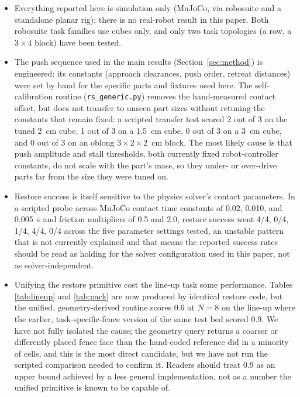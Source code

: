 \documentclass[11pt]{article}
\begin{document}
\begin{itemize}
  \item Everything reported here is simulation only (MuJoCo, via robosuite
  and a standalone planar rig); there is no real-robot result in this
  paper. Both robosuite task families use cubes only, and only two task
  topologies (a row, a $3\times4$ block) have been tested.
  \item The push sequence used in the main results (Section~\ref{sec:method})
  is engineered: its constants (approach clearances, push order, retreat
  distances) were set by hand for the specific parts and fixtures used
  here. The self-calibration routine (\texttt{rs\_generic.py}) removes the
  hand-measured contact offset, but does not transfer to unseen part sizes
  without retuning the constants that remain fixed: a scripted transfer
  test scored 2 out of 3 on the tuned 2~cm cube, 1 out of 3 on a 1.5~cm
  cube, 0 out of 3 on a 3~cm cube, and 0 out of 3 on an oblong
  $3\times2\times2$~cm block. The most likely cause is that push amplitude
  and stall thresholds, both currently fixed robot-controller constants,
  do not scale with the part's mass, so they under- or over-drive parts far
  from the size they were tuned on.
  \item Restore success is itself sensitive to the physics solver's contact
  parameters. In a scripted probe across MuJoCo contact time constants of
  0.02, 0.010, and 0.005~s and friction multipliers of 0.5 and 2.0, restore
  success went 4/4, 0/4, 1/4, 4/4, 0/4 across the five parameter settings
  tested, an unstable pattern that is not currently explained and that
  means the reported success rates should be read as holding for the
  solver configuration used in this paper, not as solver-independent.
  \item Unifying the restore primitive cost the line-up task some
  performance. Tables \ref{tab:lineup} and \ref{tab:pack} are now produced
  by identical restore code, but the unified, geometry-derived routine
  scores 0.6 at $N=8$ on the line-up where the earlier, task-specific-fence
  version of the same test bed scored 0.9. We have not fully isolated the
  cause; the geometry query returns a coarser or differently placed fence
  face than the hand-coded reference did in a minority of cells, and this
  is the most direct candidate, but we have not run the scripted comparison
  needed to confirm it. Readers should treat 0.9 as an upper bound achieved
  by a less general implementation, not as a number the unified primitive
  is known to be capable of.

\end{itemize}
\end{document}

